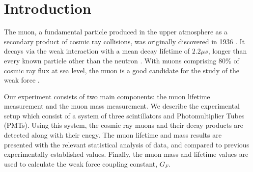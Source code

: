 
\section{Introduction}

The muon, a fundamental particle produced in the upper atmosphere as a
secondary product of cosmic ray collisions, was originally discovered
in 1936 \cite{}. It decays via the weak interaction with a mean decay
lifetime of $2.2 \mu s$, longer than every known particle other than
the neutron \cite{}. With muons comprising $80$\% of cosmic ray flux at
sea level, the muon is a good candidate for the study of the weak
force \cite{}.

Our experiment consists of two main components: the muon lifetime
measurement and the muon mass measurement. We describe the
experimental setup which consist of a system of three scintillators
and Photomultiplier Tubes (PMTs). Using this system, the cosmic ray
muons and their decay products are detected along with their
enegy. The muon lifetime and mass results are presented with the
relevant statistical analysis of data, and compared to previous
experimentally established values. Finally, the muon mass and lifetime
values are used to calculate the weak force coupling constant,
$G_F$.
